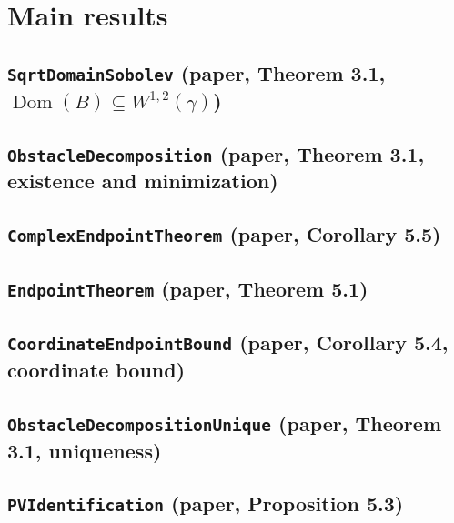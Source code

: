 \documentclass[11pt]{amsart}
\theoremstyle{definition}
\begin{document}
\section{Main results}\label{sec:main}
\subsection{\texorpdfstring{\texttt{SqrtDomainSobolev} (paper, Theorem 3.1, $\operatorname{Dom}(B)\subseteq W^{1,2}(\gamma)$)}{SqrtDomainSobolev}}\label{node:SqrtDomainSobolev}


\subsection{\texorpdfstring{\texttt{ObstacleDecomposition} (paper, Theorem 3.1, existence and minimization)}{ObstacleDecomposition}}\label{node:ObstacleDecomposition}


\subsection{\texorpdfstring{\texttt{ComplexEndpointTheorem} (paper, Corollary 5.5)}{ComplexEndpointTheorem}}\label{node:ComplexEndpointTheorem}


\subsection{\texorpdfstring{\texttt{EndpointTheorem} (paper, Theorem 5.1)}{EndpointTheorem}}\label{node:EndpointTheorem}


\subsection{\texorpdfstring{\texttt{CoordinateEndpointBound} (paper, Corollary 5.4, coordinate bound)}{CoordinateEndpointBound}}\label{node:CoordinateEndpointBound}


\subsection{\texorpdfstring{\texttt{ObstacleDecompositionUnique} (paper, Theorem 3.1, uniqueness)}{ObstacleDecompositionUnique}}\label{node:ObstacleDecompositionUnique}


\subsection{\texorpdfstring{\texttt{PVIdentification} (paper, Proposition 5.3)}{PVIdentification}}\label{node:PVIdentification}

\end{document}

